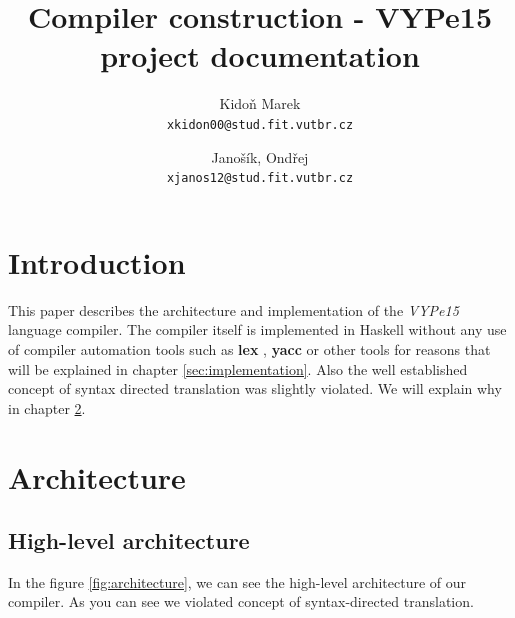 \documentclass[titlepage]{article}
\title{Compiler construction - VYPe15 project documentation}
\author{
	Kidoň Marek\\
	\texttt{xkidon00@stud.fit.vutbr.cz}
\and
	Janošík, Ondřej\\
	\texttt{xjanos12@stud.fit.vutbr.cz}
}
\date{}
\begin{document}
\maketitle

\section{Introduction}
This paper describes the architecture and implementation of the \textit{VYPe15} language
compiler. The compiler itself is implemented in Haskell without any use of compiler
automation
tools such as \textbf{lex} \cite{lex}, \textbf{yacc} \cite{yacc} or
other tools for reasons that will be explained in chapter
\ref{sec:implementation}. Also the well established concept of
syntax directed translation was slightly violated.
We will explain why in chapter \ref{sec:architecture}.

\section{Architecture}
\label{sec:architecture}

\subsection{High-level architecture}
In the figure \ref{fig:architecture}, we can see the high-level architecture of our
compiler. As you can see we violated concept of syntax-directed translation.
\end{document}
